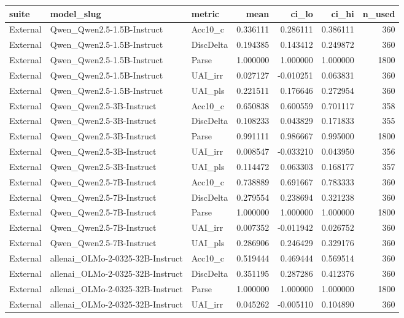 \begin{tabular}{lllrrrr}
\toprule
suite & model_slug & metric & mean & ci_lo & ci_hi & n_used \\
\midrule
External & Qwen_Qwen2.5-1.5B-Instruct & Acc10_c & 0.336111 & 0.286111 & 0.386111 & 360 \\
External & Qwen_Qwen2.5-1.5B-Instruct & DiscDelta & 0.194385 & 0.143412 & 0.249872 & 360 \\
External & Qwen_Qwen2.5-1.5B-Instruct & Parse & 1.000000 & 1.000000 & 1.000000 & 1800 \\
External & Qwen_Qwen2.5-1.5B-Instruct & UAI_irr & 0.027127 & -0.010251 & 0.063831 & 360 \\
External & Qwen_Qwen2.5-1.5B-Instruct & UAI_pls & 0.221511 & 0.176646 & 0.272954 & 360 \\
External & Qwen_Qwen2.5-3B-Instruct & Acc10_c & 0.650838 & 0.600559 & 0.701117 & 358 \\
External & Qwen_Qwen2.5-3B-Instruct & DiscDelta & 0.108233 & 0.043829 & 0.171833 & 355 \\
External & Qwen_Qwen2.5-3B-Instruct & Parse & 0.991111 & 0.986667 & 0.995000 & 1800 \\
External & Qwen_Qwen2.5-3B-Instruct & UAI_irr & 0.008547 & -0.033210 & 0.043950 & 356 \\
External & Qwen_Qwen2.5-3B-Instruct & UAI_pls & 0.114472 & 0.063303 & 0.168177 & 357 \\
External & Qwen_Qwen2.5-7B-Instruct & Acc10_c & 0.738889 & 0.691667 & 0.783333 & 360 \\
External & Qwen_Qwen2.5-7B-Instruct & DiscDelta & 0.279554 & 0.238694 & 0.321238 & 360 \\
External & Qwen_Qwen2.5-7B-Instruct & Parse & 1.000000 & 1.000000 & 1.000000 & 1800 \\
External & Qwen_Qwen2.5-7B-Instruct & UAI_irr & 0.007352 & -0.011942 & 0.026752 & 360 \\
External & Qwen_Qwen2.5-7B-Instruct & UAI_pls & 0.286906 & 0.246429 & 0.329176 & 360 \\
External & allenai_OLMo-2-0325-32B-Instruct & Acc10_c & 0.519444 & 0.469444 & 0.569514 & 360 \\
External & allenai_OLMo-2-0325-32B-Instruct & DiscDelta & 0.351195 & 0.287286 & 0.412376 & 360 \\
External & allenai_OLMo-2-0325-32B-Instruct & Parse & 1.000000 & 1.000000 & 1.000000 & 1800 \\
External & allenai_OLMo-2-0325-32B-Instruct & UAI_irr & 0.045262 & -0.005110 & 0.104890 & 360 \\

\end{tabular}
